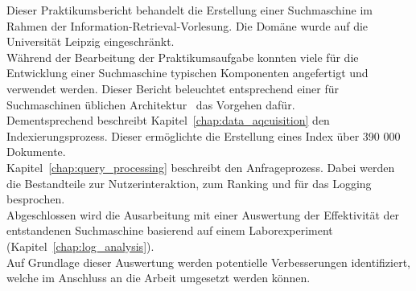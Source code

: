Dieser Praktikumsbericht behandelt die Erstellung einer Suchmaschine im Rahmen der Information-Retrieval-Vorlesung.
Die Domäne wurde auf die Universität Leipzig eingeschränkt.\\
Während der Bearbeitung der Praktikumsaufgabe konnten viele für die Entwicklung einer Suchmaschine
typischen Komponenten angefertigt und verwendet werden.
Dieser Bericht beleuchtet entsprechend einer für Suchmaschinen üblichen Architektur~\cite{croft.chap2} das
Vorgehen dafür.\\
Dementsprechend beschreibt Kapitel~\ref{chap:data_aqcuisition} den Indexierungsprozess.
Dieser ermöglichte die Erstellung eines Index über 390 000 Dokumente.\\
Kapitel~\ref{chap:query_processing} beschreibt den Anfrageprozess.
Dabei werden die Bestandteile zur Nutzerinteraktion, zum Ranking und für das Logging besprochen.\\
Abgeschlossen wird die Ausarbeitung mit einer Auswertung
der Effektivität der entstandenen Suchmaschine basierend auf einem Laborexperiment (Kapitel~\ref{chap:log_analysis}).\\
Auf Grundlage dieser Auswertung werden potentielle Verbesserungen identifiziert, welche im Anschluss an die Arbeit umgesetzt
werden können.

